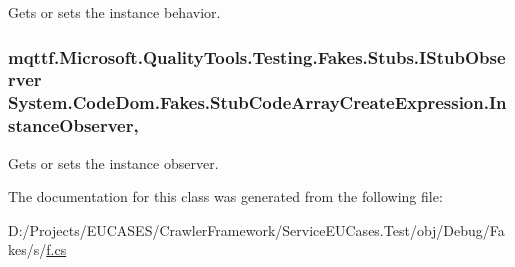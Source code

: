 Gets or sets the instance behavior.

\hypertarget{class_system_1_1_code_dom_1_1_fakes_1_1_stub_code_array_create_expression_a73e785029766d80c8d5c33bd7e9a2303}{
\subsubsection[{Instance\-Observer}]{\setlength{\rightskip}{0pt plus 5cm}mqttf.\-Microsoft.\-Quality\-Tools.\-Testing.\-Fakes.\-Stubs.\-I\-Stub\-Observer System.\-Code\-Dom.\-Fakes.\-Stub\-Code\-Array\-Create\-Expression.\-Instance\-Observer\hspace{0.3cm}{\ttfamily [get]}, {\ttfamily [set]}}}\label{class_system_1_1_code_dom_1_1_fakes_1_1_stub_code_array_create_expression_a73e785029766d80c8d5c33bd7e9a2303}


Gets or sets the instance observer.



The documentation for this class was generated from the following file\-:\begin{DoxyCompactItemize}
\item 
D\-:/\-Projects/\-E\-U\-C\-A\-S\-E\-S/\-Crawler\-Framework/\-Service\-E\-U\-Cases.\-Test/obj/\-Debug/\-Fakes/s/\hyperlink{s_2f_8cs}{f.\-cs}\end{DoxyCompactItemize}
